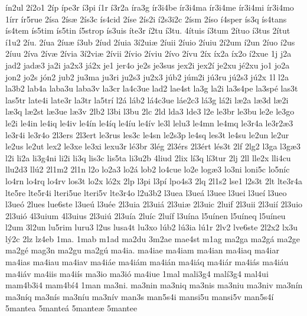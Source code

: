 {^^edn2ul
2^^ed2o1
2^^edp
^^edpe3r
^^ed3pi
^^ed1r
^^ed3r2a
^^edra3g
^^edr3i4be
^^edr3i4ma
^^edr3i4me
^^edr3i4mi
^^edr3i4mo
1^^edrr
^^edr5rue
2^^edsa
2^^eds^^e6
2^^eds3c
^^eds4cid
2^^edse
2^^eds2i
^^ed2s3i2c
2^^edsm
2^^edso
^^ed4sper
^^eds3q
^^eds4tans
^^eds4tem
^^eds5tim
^^eds5tin
^^ed5strop
^^eds3uis
^^edte3r
^^ed2tu
^^ed3tu.
4^^edtuis
^^ed3tum
2^^edtuo
^^ed3tus
2^^edtut
^^ed1u2
2^^edu.
2^^edua
2^^edu^^e6
^^ed3ub
2^^edud
2^^eduia
3^^ed2ui^^e6
2^^eduii
2^^eduio
2^^eduiu
2^^ed2um
^^ed2un
2^^eduo
^^ed2us
2^^eduu
2^^edva
2^^edv^^e6
2^^edvia
3^^ed2vi^^e6
2^^edvii
2^^edvio
2^^edviu
2^^edvo
2^^edvu
2^^edx
^^edx2a
^^edx2o
^^ed2xue
1j
j2a
jad2
jad^^e63
ja2i
ja2x3
j^^e12x
je1
jer4o
je2s
je3sus
jex2i
jex2^^ed
je2xu
j^^e92xu
jo1
jo2a
jon2
jo2s
j^^f3n2
jub2
ju3ma
ju3ri
ju2s3
ju2x3
j^^fab2
j^^fam2i
j^^fa3ru
j^^fa2s3
j^^fa2x
1l
l2a
la3b2
lab4a
laba3u
laba3v
la3cr
la4c3ue
lad2
lae4st
la3g
la2i
la3s4pe
la3sp^^e9
las3t
las5tr
late4i
late3r
la3tr
la5tr^^ed
l2^^e1
l^^e1b2
l^^e14c3ue
l^^e1e2c3
l^^e13g
l^^e12i
l^^e62a
l^^e63d
l^^e62i
l^^e63q
l^^e62st
l^^e63ue
l^^e63v
2lb2
l3bi
l3bu
2lc
2ld
lda3
lde3
l2e
le3br
le3bu
le2e
le3go
le2i
le4in
le4iq
le4iv
le4^^edn
le4^^edq
le4^^edu
le4^^edv
le3l
lelu3
le4mn
le4mq
le3r4a
le3r2^^e63
le3r4i
le3r4o
2l3ers
2l3ert
le3rus
les3c
le4sn
le2s3p
le4sq
les3t
le4su
le2un
le2ur
le2us
le2ut
lex2
le3xe
le3xi
lexu3r
l^^e93br
3l^^e9g
2l3^^e9rs
2l3^^e9rt
l^^e9s3t
2lf
2lg2
l3ga
l3g^^e63
l2i
li2a
li3g4ni
li2i
li3q
lis3c
lis5ta
li3u2b
4liud
2lix
l^^ed3q
l^^ed3tur
2lj
2ll
lle2x
lli4cu
llu2d3
ll^^fa2
2l1m2
2l1n
l2o
lo2a3
lo2^^e1
lob2
lo4cue
lo2e
log^^e63
lo3ni
loni5c
lo5n^^edc
lo4rn
lo4rq
lo4rv
los3t
lo2x
l^^f32x
2lp
l3pi
l3p^^ed
lpo4s3
2lq
2l1s2
lse1
l2s3t
2lt
lte3r4a
lte5re
lte5r4i
lteri5ue
lteri5v
lte3r4o
l2u3b2
l3uea
l3ue^^e1
l3uee
l3uei
l3ue^^ed
l3ueo
l3ue^^f3
2lues
lue6ste
l3ue^^fa
l3u^^e9e
2l3uia
2l3ui^^e1
2l3ui^^e6
2l3uic
2luif
2l3uii
2l3ui^^ed
2l3uio
2l3ui^^f3
4l3uium
4l3uius
2l3ui^^fa
2l3u^^eda
2lu^^edc
2lu^^edf
l3u^^edna
l5u^^ednen
l5u^^edneq
l5u^^edneu
l2um
3l2un
lu5rim
luru3
l2us
lusa4t
lu3xo
l^^fab2
l^^fa3ia
l^^fa1r
2lv2
lve6ste
2l2x2
lx3u
l^^fd2c
2lz
lz4eb
1ma.
1mab
m1ad
ma2du
3m2ae
mae4st
m1ag
ma2ga
ma2g^^e1
ma2ge
ma2g^^e9
mag3n
ma2gu
ma2g^^fa
ma4ia.
ma4iae
ma4iam
ma4ian
ma4iaq
ma4iar
ma4ias
ma4iau
ma4iav
ma4i^^e1e
ma4i^^e1m
ma4i^^e1n
ma4i^^e1q
ma4i^^e1r
ma4i^^e1s
ma4i^^e1u
ma4i^^e1v
ma4iis
ma4i^^eds
ma3io
ma3i^^f3
ma4iue
1mal
mali3g4
mal^^ed3g4
mal4ui
mam4b3i4
mam4b^^ed4
1man
ma3ni.
ma3nin
ma3niq
ma3nis
ma3niu
ma3niv
ma3n^^edn
ma3n^^edq
ma3n^^eds
ma3n^^edu
ma3n^^edv
man3s
man5s4i
mansi5u
mansi5v
man5s4^^ed
5mantea
5mante^^e1
5mante^^e6
5mantee
}

